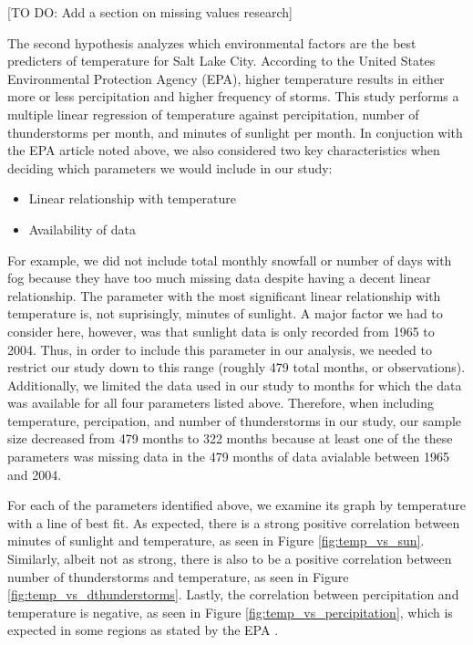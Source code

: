 [TO DO: Add a section on missing values research]

The second hypothesis analyzes which environmental factors are the best predicters of temperature for Salt Lake City. According to the United States Environmental Protection Agency (EPA), higher temperature results in either more or less percipitation and higher frequency of storms\cite{epa_utah}. This study performs a multiple linear regression of temperature against percipitation, number of thunderstorms per month, and minutes of sunlight per month. In conjuction with the EPA article noted above, we also considered two key characteristics when deciding which parameters we would include in our study: 

\begin{itemize}
	\item Linear relationship with temperature
	\item Availability of data
\end{itemize}

For example, we did not include total monthly snowfall or number of days with fog because they have too much missing data despite having a decent linear relationship. The parameter with the most significant linear relationship with temperature is, not suprisingly, minutes of sunlight. A major factor we had to consider here, however, was that sunlight data is only recorded from 1965 to 2004. Thus, in order to include this parameter in our analysis, we needed to restrict our study down to this range (roughly 479 total months, or observations). Additionally, we limited the data used in our study to months for which the data was available for all four parameters listed above. Therefore, when including temperature, percipation, and number of thunderstorms in our study, our sample size decreased from 479 months to 322 months because at least one of the these parameters was missing data in the 479 months of data avialable between 1965 and 2004.

 For each of the parameters identified above, we examine its graph by temperature with a line of best fit. As expected, there is a strong positive correlation between minutes of sunlight and temperature, as seen in Figure \ref{fig:temp_vs_sun}. Similarly, albeit not as strong, there is also to be a positive correlation between number of thunderstorms and temperature, as seen in Figure \ref{fig:temp_vs_dthunderstorms}. Lastly, the correlation between percipitation and temperature is negative, as seen in Figure \ref{fig:temp_vs_percipitation}, which is expected in some regions as stated by the EPA \cite{epa_utah}.

